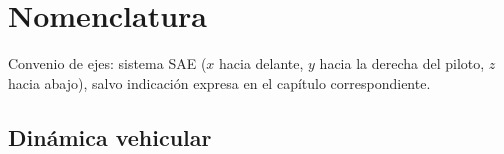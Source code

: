\chapter*{Nomenclatura}

Convenio de ejes: sistema SAE (\(x\) hacia delante, \(y\) hacia la derecha del
piloto, \(z\) hacia abajo), salvo indicación expresa en el capítulo
correspondiente. 

\section*{Dinámica vehicular}

